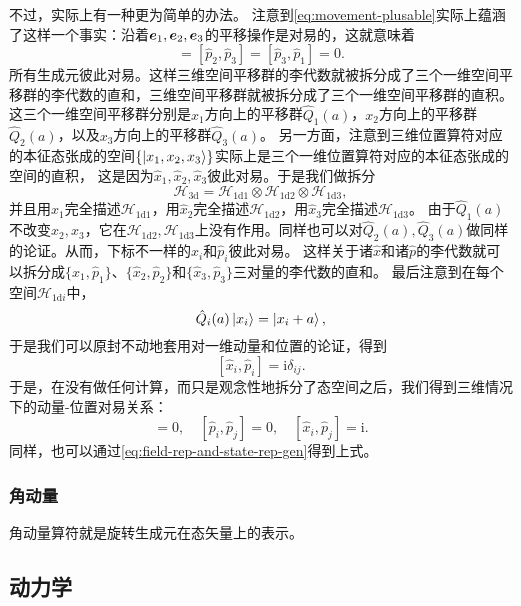 \documentclass[hyperref, UTF8, a4paper]{ctexart}
\newcommand*{\ii}{\mathrm{i}}
\begin{document}
不过，实际上有一种更为简单的办法。
注意到\eqref{eq:movement-plusable}实际上蕴涵了这样一个事实：沿着$\vb*{e}_1, \vb*{e}_2, \vb*{e}_3$的平移操作是对易的，这就意味着
\begin{equation}
    [\hat{p}_1, \hat{p}_2] = [\hat{p}_2, \hat{p}_3] = [\hat{p}_3, \hat{p}_1] = 0.
\end{equation}
所有生成元彼此对易。这样三维空间平移群的李代数就被拆分成了三个一维空间平移群的李代数的直和，三维空间平移群就被拆分成了三个一维空间平移群的直积。
这三个一维空间平移群分别是$x_1$方向上的平移群$\hat{Q}_1(a)$，$x_2$方向上的平移群$\hat{Q}_2(a)$，以及$x_3$方向上的平移群$\hat{Q}_3(a)$。
另一方面，注意到三维位置算符对应的本征态张成的空间$\{ \ket{x_1, x_2, x_3} \}$实际上是三个一维位置算符对应的本征态张成的空间的直积，
这是因为$\hat{x}_1, \hat{x}_2, \hat{x}_3$彼此对易。于是我们做拆分
\[
    \mathcal{H}_\text{3d} = \mathcal{H}_\text{1d1} \otimes \mathcal{H}_\text{1d2} \otimes \mathcal{H}_\text{1d3},
\]
并且用$\hat{x}_1$完全描述$\mathcal{H}_\text{1d1}$，用$\hat{x}_2$完全描述$\mathcal{H}_\text{1d2}$，用$\hat{x}_3$完全描述$\mathcal{H}_\text{1d3}$。
由于$\hat{Q}_1(a)$不改变$x_2, x_3$，它在$\mathcal{H}_\text{1d2},\mathcal{H}_\text{1d3}$上没有作用。同样也可以对$\hat{Q}_2(a),\hat{Q}_3(a)$做同样的论证。从而，下标不一样的$\hat{x}_i$和$\hat{p}_i$彼此对易。
这样关于诸$\hat{x}$和诸$\hat{p}$的李代数就可以拆分成$\{\hat{x}_1, \hat{p}_1\}$、$\{\hat{x}_2, \hat{p}_2\}$和$\{\hat{x}_3, \hat{p}_3\}$三对量的李代数的直和。
最后注意到在每个空间$\mathcal{H}_\text{1d$i$}$中，
\[
    \hat{Q}_i(a) \ket{x_i} = \ket{x_i + a},
\]
于是我们可以原封不动地套用对一维动量和位置的论证，得到
\[
    [\hat{x}_i, \hat{p}_i] = \ii \delta_{ij}.
\]
于是，在没有做任何计算，而只是观念性地拆分了态空间之后，我们得到三维情况下的动量-位置对易关系：
\begin{equation}
    [\hat{x}_i, \hat{x}_j] = 0, \quad [\hat{p}_i, \hat{p}_j] = 0, \quad [\hat{x}_i, \hat{p}_j] = \ii .
\end{equation}
同样，也可以通过\eqref{eq:field-rep-and-state-rep-gen}得到上式。

\subsubsection{角动量}

角动量算符就是旋转生成元在态矢量上的表示。

\subsection{动力学}
\end{document}
